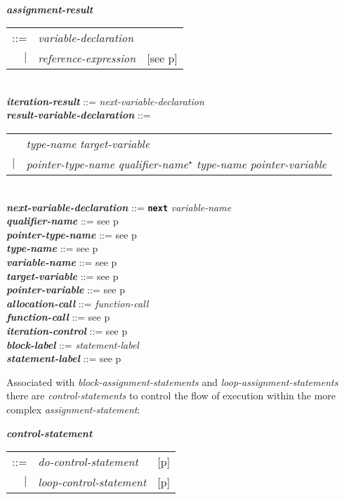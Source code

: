 \documentclass[12pt]{article}
\newcommand{\STAR}{{\Large $^\star$}}
\newcommand{\ttkey}[1]{{\tt \bfseries #1}}
\newcommand{\emkey}[1]{{\em \bfseries #1}}
\newcommand{\pagref}[1]{p\pageref{#1}}
\newenvironment{indpar}[1][0.3in]%
	{\begin{list}{}%
		     {\setlength{\itemsep}{0in}%
		      \setlength{\topsep}{0in}%
		      \setlength{\parsep}{1ex}%
		      \setlength{\labelwidth}{#1}%
		      \setlength{\leftmargin}{#1}%
		      \addtolength{\leftmargin}{\labelsep}}%
	 \item}%
	{\end{list}}
\begin{document}
\begin{indpar}
\\[0.5ex]
\emkey{assignment-result}\label{ASSIGNMENT-RESULT}
    \begin{tabular}[t]{@{}rll}
    ::= & {\em variable-declaration} \\
    $|$ & {\em reference-expression}
    		& [see \pagref{REFERENCE-EXPRESSIONS}] \\
    \end{tabular}
\\[0.5ex]
\emkey{iteration-result} ::= {\em next-variable-declaration}
\\[0.5ex]
\emkey{result-variable-declaration}\label{RESULT-VARIABLE-DECLARATION} ::= \\
\hspace*{0.5in}\begin{tabular}{rl}
	    & {\em type-name} {\em target-variable} \\
	$|$ & {\em pointer-type-name} {\em qualifier-name}\STAR{}
	      {\em type-name} {\em pointer-variable}
	\end{tabular}
\\[0.5ex]
\emkey{next-variable-declaration}\label{NEXT-VARIABLE-DECLARATION}
    ::= \ttkey{next} {\em variable-name}
\\[0.5ex]
\emkey{qualifier-name} ::= see \pagref{QUALIFIER-NAME}
\\[0.5ex]
\emkey{pointer-type-name} ::= see \pagref{POINTER-TYPE-NAME}
\\[0.5ex]
\emkey{type-name} ::= see \pagref{TYPE-NAME}
\\[0.5ex]
\emkey{variable-name} ::= see \pagref{VARIABLE-NAME}
\\[0.5ex]
\emkey{target-variable} ::= see \pagref{TARGET-VARIABLE}
\\[0.5ex]
\emkey{pointer-variable} ::= see \pagref{POINTER-VARIABLE}
\\[0.5ex]
\emkey{allocation-call} ::= {\em function-call}
\\[0.5ex]
\emkey{function-call} ::= see \pagref{FUNCTION-CALLS}
\\[0.5ex]
\emkey{iteration-control} ::= see \pagref{ITERATION-CONTROL}
\\[0.5ex]
\emkey{block-label} ::= {\em statement-label}
\\[0.5ex]
\emkey{statement-label} ::= see \pagref{STATEMENT-LABEL}
\end{indpar}

Associated with {\em block-assignment-statements} and
{\em loop-assignment-statements}
there are {\em con\-trol-statements}
to control the flow of execution within the more complex
{\em assignment-state\-ment}:
\begin{indpar}
\emkey{control-statement}\label{CONTROL-STATEMENT}
    \begin{tabular}[t]{@{}rll}
    ::= & {\em do-control-statement}
        & [\pagref{BLOCK-CONTROL-STATEMENT}] \\
    $|$ & {\em loop-control-statement}
        & [\pagref{LOOP-CONTROL-STATEMENT}] \\
    \end{tabular}
\end{indpar}
\end{document}
